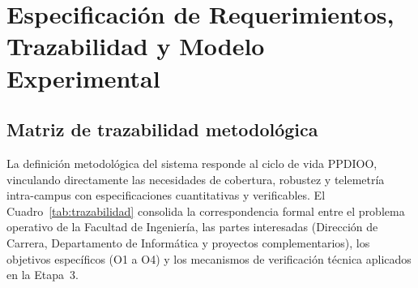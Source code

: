 \documentclass[12pt,oneside,openany,spanish,oldfontcommands]{memoir}
\begin{document}
\chapter{Especificación de Requerimientos, Trazabilidad y Modelo Experimental}\label{cap:requerimientos}

\section{Matriz de trazabilidad metodológica}\label{sec:trazabilidad}

La definición metodológica del sistema responde al ciclo de vida PPDIOO, vinculando directamente las necesidades de cobertura, robustez y telemetría intra-campus con especificaciones cuantitativas y verificables. El Cuadro~\ref{tab:trazabilidad} consolida la correspondencia formal entre el problema operativo de la Facultad de Ingeniería, las partes interesadas (Dirección de Carrera, Departamento de Informática y proyectos complementarios), los objetivos específicos (O1 a O4) y los mecanismos de verificación técnica aplicados en la Etapa~3.
\end{document}
